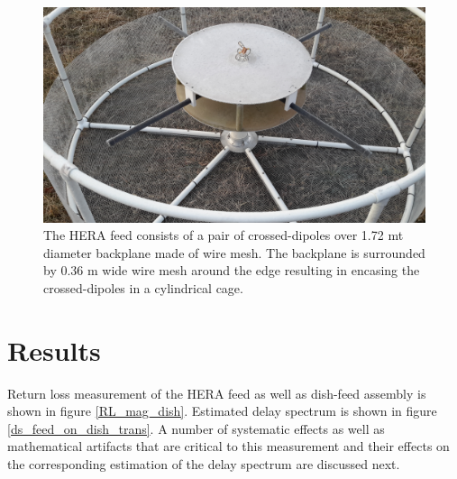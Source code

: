 \documentclass[twocolumn]{emulateapj}
\newcommand{\vis}{{V}}
\begin{document}
    \begin{figure}
    \centering
    \includegraphics[trim={2cm 10cm 20cm 5cm},clip, totalheight=0.3\textheight]{plots/herafeed.jpg}
    \vspace{1.0 em}
    \caption{The HERA feed consists of a pair of crossed-dipoles over 1.72 mt diameter backplane made of wire mesh. The backplane is surrounded by 0.36 m wide wire mesh around the edge resulting in encasing the crossed-dipoles in a cylindrical cage.}
    \label{fig:herafeed}
    \end{figure}
    
    
    \section{\textbf{Results}}
    
    Return loss measurement of the HERA feed as well as dish-feed assembly is shown in figure \ref{RL_mag_dish}. Estimated        
    delay spectrum is shown in figure \ref{ds_feed_on_dish_trans}. A number of systematic effects as well as
    mathematical artifacts that are critical to this measurement and their effects
    on the corresponding estimation of the delay spectrum are discussed next. 
    
    
    
\end{document}
